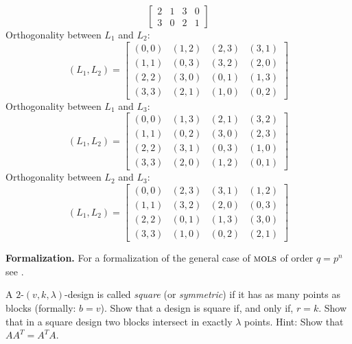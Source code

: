 \begin{test}
$$\begin{bmatrix}
            2   &1  &3  &0\\
            3   &0  &2  &1
        \end{bmatrix}
    $$
    Orthogonality between $L_1$ and $L_2$:
    $$
        (L_1,L_2) = \begin{bmatrix}
            (0,0)   &(1,2)   &(2,3)   &(3,1)\\
            (1,1)    &(0,3)   &(3,2)   &(2,0)\\
            (2,2)    &(3,0)   &(0,1)   &(1,3)\\
            (3,3)    &(2,1)   &(1,0)   &(0,2)
        \end{bmatrix}
    $$
    Orthogonality between $L_1$ and $L_3$:
    $$
        (L_1,L_2) = \begin{bmatrix}
            (0,0)   &(1,3)   &(2,1)   &(3,2)\\
            (1,1)    &(0,2)   &(3,0)   &(2,3)\\
            (2,2)    &(3,1)   &(0,3)   &(1,0)\\
            (3,3)    &(2,0)   &(1,2)   &(0,1)
        \end{bmatrix}
    $$
    Orthogonality between $L_2$ and $L_3$:
    $$
        (L_1,L_2) = \begin{bmatrix}
            (0,0)   &(2,3)   &(3,1)   &(1,2)\\
            (1,1)    &(3,2)   &(2,0)   &(0,3)\\
            (2,2)    &(0,1)   &(1,3)   &(3,0)\\
            (3,3)    &(1,0)   &(0,2)   &(2,1)
        \end{bmatrix}
    $$
\end{test}

\textbf{Formalization.} For a formalization of the general case of $\operatorname{\textsc{mols}}$ of order $q=p^n$ see \citep{BurroniFiniteGeometryRepo}.

\begin{exr}
    A\/ $2$-$(v, k, \lambda)$-design is called \textsl{square} (or \textsl{symmetric}) if it has as many points as blocks (formally:\/ $b = v$). Show that a design is square if, and only if, $r = k$. Show that in a square design two blocks intersect in exactly\/ $\lambda$ points. {\upshape Hint: Show that\/ $AA^T = A^T\!A$.}
\end{exr}

